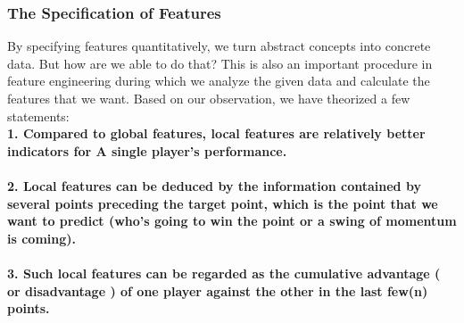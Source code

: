 \documentclass[UTF8]{mcmthesis}
\begin{document}
	\subsubsection{ The Specification of Features}
	By specifying features quantitatively, we turn abstract concepts into concrete data. But how are we able to do that? This is also an important procedure in feature engineering during which we analyze the given data and calculate the features that we want.
    Based on our observation, we have theorized a few statements:\\
    \textbf{1. Compared to global features, local features are relatively better indicators for A single player’s performance.}\\\\
\textbf{2. Local features can be deduced by the information contained by several points preceding the target point, which is the point that we want to predict (who’s going to win the point or a swing of momentum is coming).}\\\\
\textbf{3. Such local features can be regarded as the cumulative advantage ( or disadvantage ) of one player against the other in the last few(n) points.}\\
\end{document}
